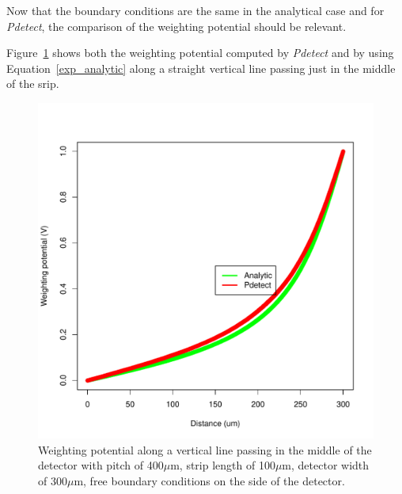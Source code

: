 \documentclass[11pt]{article}
\begin{document}
		Now that the boundary conditions are the same in the analytical case and for \textit{Pdetect},
		the comparison of the weighting potential should be relevant.

		Figure~\ref{fig:semi_free_conditions} shows both the weighting potential computed by \textit{Pdetect}
		and by using Equation~\ref{exp_analytic} along a straight vertical line passing just in the middle of
		the srip.

		\begin{figure}[H]
			\begin{minipage}[b]{.46\linewidth}
				\center
				\includegraphics[scale=0.45]{images/boundary_conditions/semi-free.pdf}
				\caption{Weighting potential along a vertical line passing in the middle of the detector with pitch
						of 400$\mu$m, strip length of 100$\mu$m, detector width of 300$\mu$m, free boundary conditions
						on the side of the detector.}
				\label{fig:semi_free_conditions}
				\end{minipage} \hfill
				\begin{minipage}[b]{.46\linewidth}
				\center

\end{minipage}
\end{figure}
\end{document}
